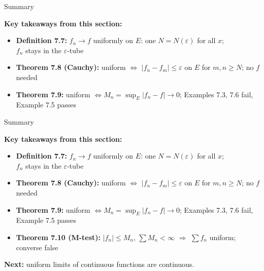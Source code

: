 \documentclass[aspectratio=169,12pt,t]{beamer}
\begin{document}
{%
\begin{frame}{Summary}
  \begin{hlbox}
  \textbf{Key takeaways from this section:}
  \begin{itemize}
    \item \textbf{Definition 7.7:} $f_n \to f$ \alert{uniformly} on $E$: one
      $N = N(\varepsilon)$ for all $x$;\\
      $f_n$ stays in the $\varepsilon$-tube
    \item \textbf{Theorem 7.8 (Cauchy):} uniform $\iff$
      $|f_n - f_m| \leq \varepsilon$ on $E$ for $m, n \geq N$; \alert{no $f$ needed}
    \item \textbf{Theorem 7.9:} uniform $\iff M_n = \sup_E |f_n - f| \to 0$;
      Examples 7.3, 7.6 fail, Example 7.5 passes
  \end{itemize}
  \end{hlbox}

\end{frame}

\begin{frame}{Summary}
  \begin{hlbox}
  \textbf{Key takeaways from this section:}
  \begin{itemize}
    \item \textbf{Definition 7.7:} $f_n \to f$ \alert{uniformly} on $E$: one
      $N = N(\varepsilon)$ for all $x$;\\
      $f_n$ stays in the $\varepsilon$-tube
    \item \textbf{Theorem 7.8 (Cauchy):} uniform $\iff$
      $|f_n - f_m| \leq \varepsilon$ on $E$ for $m, n \geq N$; \alert{no $f$ needed}
    \item \textbf{Theorem 7.9:} uniform $\iff M_n = \sup_E |f_n - f| \to 0$;
      Examples 7.3, 7.6 fail, Example 7.5 passes
    \item \textbf{Theorem 7.10 (M-test):} $|f_n| \leq M_n$, $\sum M_n < \infty$
      $\Rightarrow$ $\sum f_n$ uniform; converse false
  \end{itemize}

  \vspace{0.2em}
  \textbf{Next:} uniform limits of continuous functions are \alert{continuous}.
  \end{hlbox}


\end{frame}}
\end{document}

